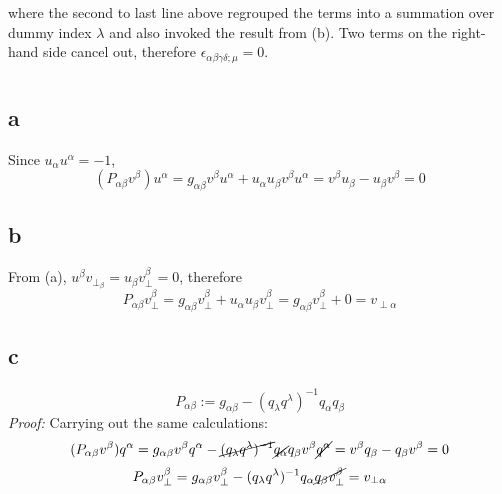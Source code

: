 \documentclass{article}
\begin{document}
where the second to last line above regrouped the terms into a summation over dummy index $\lambda$ and also invoked the result from (b). 
Two terms on the right-hand side cancel out, therefore $\epsilon_{\alpha\beta\gamma\delta;\mu}  = 0$.
\section{}
\subsection*{a}
Since $u_\alpha u^\alpha  = -1$,
\[
	(P_{\alpha\beta}v^\beta) u^\alpha = g_{\alpha\beta} v^\beta u^\alpha +  u_{\alpha}u_{\beta} v^\beta u^\alpha
	= v^\beta u_\beta - u_\beta v^\beta = 0
\]
\subsection*{b}
From (a), $u^\beta v_{\perp_\beta} = u_{\beta} v_{\perp}^\beta = 0$, therefore
\[
	P_{\alpha\beta}v_{\perp}^\beta =  g_{\alpha\beta} v_{\perp}^\beta +  u_{\alpha}u_{\beta} v_{\perp}^\beta
	=  g_{\alpha\beta} v_{\perp}^\beta +  0 = v_{\perp\alpha}
\]
\subsection*{c}
\[
	P_{\alpha\beta} := g_{\alpha\beta}  - ({q_\lambda q^\lambda})^{-1} q_{\alpha}q_{\beta}
\]
\textit{Proof:} Carrying out the same calculations:
\[  (P_{\alpha\beta}v^\beta) q^\alpha = g_{\alpha\beta} v^\beta q^\alpha - \cancel{({q_\lambda q^\lambda})^{-1}} \cancel{q_{\alpha}}q_{\beta} v^\beta \cancel{q^\alpha} = v^\beta q_\beta - q_\beta v^\beta = 0 \]
\[
	P_{\alpha\beta}v_{\perp}^\beta =  g_{\alpha\beta} v_{\perp}^\beta  - ({q_\lambda q^\lambda})^{-1} q_{\alpha}\cancel{q_{\beta}  v_{\perp}^\beta} = v_{\perp\alpha}
\]
\end{document}
